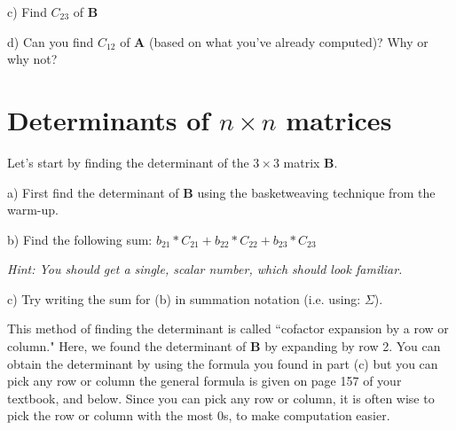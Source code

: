 \documentclass{article}
\begin{document}
\begin{flushleft}
\vspace{0.75in}

c) Find $C_{23}$ of $\textbf{B}$

\vspace{0.75in}

d) Can you find $C_{12}$ of \textbf{A} (based on what you've already computed)? Why or why not?\\

\vspace{1in}

\section{Determinants of $n \times n$ matrices}

Let's start by finding the determinant of the $3 \times 3$ matrix $\textbf{B}$.

\vspace{0.2in}

a) First find the determinant of $\textbf{B}$ using the basketweaving technique from the warm-up.

\pagebreak

b) Find the following sum: \hspace{0.2in} $b_{21}*C_{21} + b_{22}*C_{22} + b_{23}*C_{23}$ \\

\vspace{0.2in}

\textit{Hint: You should get a single, scalar number, which should look familiar.}\\

\vspace{1in}

c) Try writing the sum for (b) in summation notation (i.e. using: $\Sigma$).\\

\vspace{2in}

This method of finding the determinant is called ``cofactor expansion by a row or column."  Here, we found the determinant of $\textbf{B}$ by expanding by row 2.  You can obtain the determinant by using the formula you found in part (c) but you can pick any row or column the general formula is given on page 157 of your textbook, and below.  Since you can pick any row or column, it is often wise to pick the row or column with the most 0s, to make computation easier.

\vspace{0.2in}


\end{flushleft}
\end{document}
